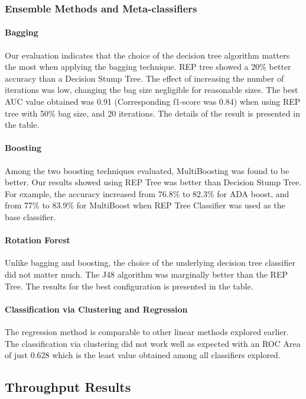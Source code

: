 \subsubsection{Ensemble Methods and Meta-classifiers}

\paragraph{Bagging}

Our evaluation indicates that the choice of the decision tree algorithm matters the most when applying the bagging technique. REP tree showed a 20\% better accuracy than a Decision Stump Tree. The effect of increasing the number of iterations was low, changing the bag size negligible for reasonable sizes. The best AUC value obtained was 0.91 (Corresponding f1-score was 0.84) when using REP tree with 50\% bag size, and 20 iterations. The details of the result is presented in the table.

\paragraph{Boosting}

Among the two boosting techniques evaluated, MultiBoosting was found to be better. Our results showed using REP Tree was better than Decision Stump Tree. For example, the accuracy increased from 76.8\% to 82.3\% for ADA boost, and from 77\% to 83.9\% for MultiBoost when REP Tree Classifier was used as the base classifier.

\paragraph{Rotation Forest}

Unlike bagging and boosting, the choice of the underlying decision tree classifier did not matter much. The J48 algorithm was marginally better than the REP Tree. The results for the best configuration is presented in the table.

\paragraph{Classification via Clustering and Regression}
The regression method is comparable to other linear methods explored earlier. The classification via clustering did not work well as expected with an ROC Area of just 0.628 which is the least value obtained among all classifiers explored.


\subsection{Throughput Results}


